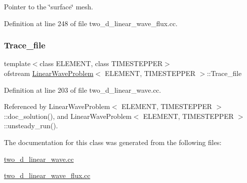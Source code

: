 Pointer to the \char`\"{}surface\char`\"{} mesh. 



Definition at line 248 of file two\+\_\+d\+\_\+linear\+\_\+wave\+\_\+flux.\+cc.

\mbox{\label{classLinearWaveProblem_ac75d13211cfb08c7cfba0ea129711a09}} 
\subsubsection{\texorpdfstring{Trace\+\_\+file}{Trace\_file}}
{\footnotesize\ttfamily template$<$class E\+L\+E\+M\+E\+NT, class T\+I\+M\+E\+S\+T\+E\+P\+P\+ER$>$ \\
ofstream \hyperlink{classLinearWaveProblem}{Linear\+Wave\+Problem}$<$ E\+L\+E\+M\+E\+NT, T\+I\+M\+E\+S\+T\+E\+P\+P\+ER $>$\+::Trace\+\_\+file\hspace{0.3cm}{\ttfamily [private]}}



Definition at line 203 of file two\+\_\+d\+\_\+linear\+\_\+wave.\+cc.



Referenced by Linear\+Wave\+Problem$<$ E\+L\+E\+M\+E\+N\+T, T\+I\+M\+E\+S\+T\+E\+P\+P\+E\+R $>$\+::doc\+\_\+solution(), and Linear\+Wave\+Problem$<$ E\+L\+E\+M\+E\+N\+T, T\+I\+M\+E\+S\+T\+E\+P\+P\+E\+R $>$\+::unsteady\+\_\+run().



The documentation for this class was generated from the following files\+:\begin{DoxyCompactItemize}
\item 
\hyperlink{two__d__linear__wave_8cc}{two\+\_\+d\+\_\+linear\+\_\+wave.\+cc}\item 
\hyperlink{two__d__linear__wave__flux_8cc}{two\+\_\+d\+\_\+linear\+\_\+wave\+\_\+flux.\+cc}\end{DoxyCompactItemize}
